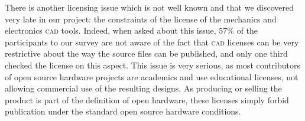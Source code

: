 \documentclass[letterpaper, 10 pt, conference]{ieeeconf}  %
\begin{document}
There is another licensing issue which is not well known and that we discovered very late in our project: the constraints of the license of the mechanics and electronics \textsc{cad} tools. 
Indeed, when asked about this issue, 57\% of the participants to our survey are not aware of the fact that \textsc{cad} licenses can be very restrictive about the way the source files can be published, and only one third checked the license on this aspect. 
This issue is very serious, as most contributors of open source hardware projects are academics and use educational licenses, not allowing commercial use of the resulting designs. 
As producing or selling the product is part of the definition of open hardware, these licenses simply forbid publication under the standard open source hardware conditions. 
\end{document}
